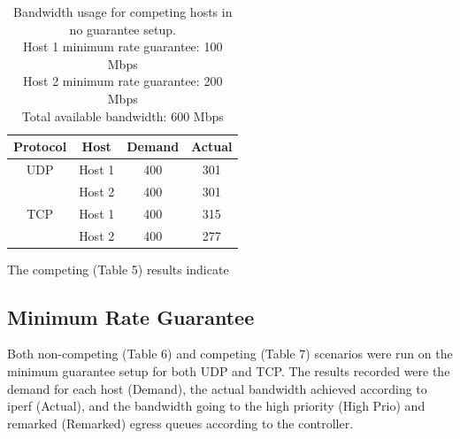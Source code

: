 \documentclass[accepted,single]{gipaper}
\begin{document}
\begin{table}[h]
	\label{ng_c}
	\vspace{-2mm}
	\begin{center}
		\begin{small}
			\begin{tabular}{cccc}
				Protocol & Host & Demand & Actual \\
				\hline
				UDP & Host 1 & 400 & 301\\
				    & Host 2 & 400 & 301\\
				\hline
				TCP & Host 1 & 400 & 315\\
				    & Host 2 & 400 & 277\\
			\end{tabular}
		\end{small}
	\end{center}
	\caption{Bandwidth usage for competing hosts in no guarantee setup.\\
	Host 1 minimum rate guarantee: 100 Mbps\\
	Host 2 minimum rate guarantee: 200 Mbps\\	
	Total available bandwidth: 600 Mbps}
	\vspace{-3mm}
\end{table}

The competing (Table 5) results indicate

\subsection{Minimum Rate Guarantee}
\label{min_guar}

Both non-competing (Table 6) and competing (Table 7) scenarios were run on the minimum guarantee setup for both UDP and TCP. The results recorded were the demand for each host (Demand), the actual bandwidth achieved according to iperf (Actual), and the bandwidth going to the high priority (High Prio) and remarked (Remarked) egress queues according to the controller. 
\end{document}
